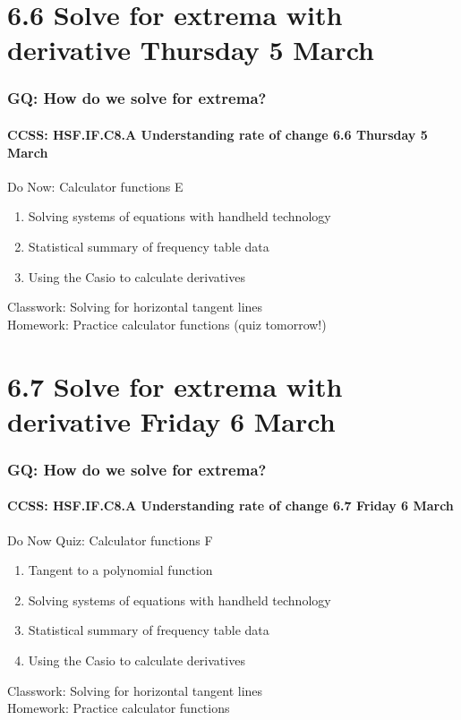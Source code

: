 \documentclass{beamer}
\begin{document}
\section{6.6 Solve for extrema with derivative \hfill Thursday 5 March}
  \frame
  {
    \frametitle{GQ: How do we solve for extrema?}
    \framesubtitle{CCSS: HSF.IF.C8.A Understanding rate of change \hfill \alert{6.6 Thursday 5 March}}
    \begin{block}{Do Now: Calculator functions E}
      \begin{enumerate}
        \item Solving systems of equations with handheld technology
        \item Statistical summary of frequency table data
        \item Using the Casio to calculate derivatives
      \end{enumerate}
      \end{block}
      Classwork: Solving for horizontal tangent lines\\
      Homework: Practice calculator functions (\alert{quiz tomorrow!})
      }

\section{6.7 Solve for extrema with derivative \hfill Friday 6 March}
  \frame
  {
    \frametitle{GQ: How do we solve for extrema?}
    \framesubtitle{CCSS: HSF.IF.C8.A Understanding rate of change \hfill \alert{6.7 Friday 6 March}}
    \begin{block}{Do Now Quiz: Calculator functions F}
      \begin{enumerate}
        \item Tangent to a polynomial function
        \item Solving systems of equations with handheld technology
        \item Statistical summary of frequency table data
        \item Using the Casio to calculate derivatives
      \end{enumerate}
      \end{block}
      Classwork: Solving for horizontal tangent lines\\
      Homework: Practice calculator functions
      }
\end{document}
